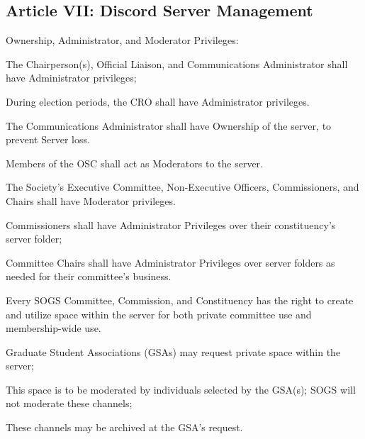 \subsection{Article VII: Discord Server Management}
\begin{longenum}[ label*=\thesubsection.\arabic*., align=left] 
\item Ownership, Administrator, and Moderator Privileges:
	\begin{longenum}[label*=\arabic*., align=left]
	\item The Chairperson(s), Official Liaison, and Communications Administrator shall have Administrator privileges;
		\begin{longenum}[label*=\arabic*., align=left]
		\item During election periods, the CRO shall have Administrator privileges.
		\end{longenum}
	\item The Communications Administrator shall have Ownership of the server, to prevent Server loss.
	\item Members of the OSC shall act as Moderators to the server.
	\item The Society's Executive Committee, Non-Executive Officers, Commissioners, and Chairs shall have Moderator privileges.
		\begin{longenum}[label*=\arabic*., align=left]
		\item Commissioners shall have Administrator Privileges over their constituency's server folder;
		\item Committee Chairs shall have Administrator Privileges over server folders as needed for their committee's business.
		\end{longenum}
	\end{longenum}
\item Every SOGS Committee, Commission, and Constituency has the right to create and utilize space within the server for both private committee use and membership-wide use.
	\begin{longenum}[label*=\arabic*., align=left]
	\item Graduate Student Associations (GSAs) may request private space within the server;
		\begin{longenum}[label*=\arabic*., align=left]
		\item This space is to be moderated by individuals selected by the GSA(s); SOGS will not moderate these channels;
		\item These channels may be archived at the GSA's request.

\end{longenum}
\end{longenum}
\end{longenum}
